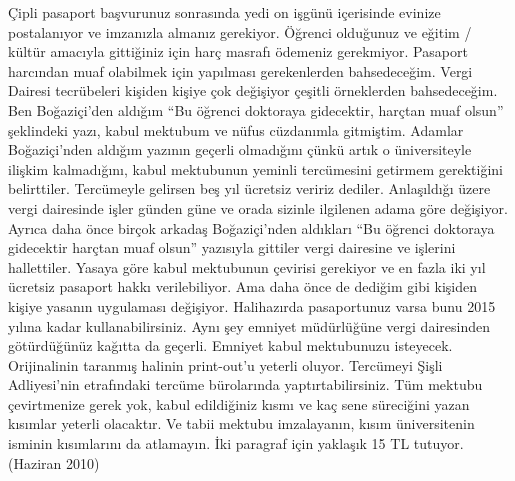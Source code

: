 \documentclass[12pt]{article}
\begin{document}
Çipli pasaport başvurunuz sonrasında yedi on işgünü içerisinde evinize postalanıyor ve imzanızla almanız gerekiyor. Öğrenci olduğunuz ve eğitim / kültür amacıyla gittiğiniz için harç masrafı ödemeniz gerekmiyor. Pasaport harcından muaf olabilmek için yapılması gerekenlerden bahsedeceğim. Vergi Dairesi tecrübeleri kişiden kişiye çok değişiyor çeşitli örneklerden bahsedeceğim. Ben Boğaziçi’den aldığım “Bu öğrenci doktoraya gidecektir, harçtan muaf olsun” şeklindeki yazı, kabul mektubum ve nüfus cüzdanımla gitmiştim. Adamlar Boğaziçi’nden aldığım yazının geçerli olmadığını çünkü artık o üniversiteyle ilişkim kalmadığını, kabul mektubunun yeminli tercümesini getirmem gerektiğini belirttiler. Tercümeyle gelirsen beş yıl ücretsiz veririz dediler. Anlaşıldığı üzere vergi dairesinde işler günden güne ve orada sizinle ilgilenen adama göre değişiyor. Ayrıca daha önce birçok arkadaş Boğaziçi’nden aldıkları “Bu öğrenci doktoraya gidecektir harçtan muaf olsun” yazısıyla gittiler vergi dairesine ve işlerini hallettiler. Yasaya göre kabul mektubunun çevirisi gerekiyor ve en fazla iki yıl ücretsiz pasaport hakkı verilebiliyor. Ama daha önce de dediğim gibi kişiden kişiye yasanın uygulaması değişiyor. Halihazırda pasaportunuz varsa bunu 2015 yılına kadar kullanabilirsiniz. Aynı şey emniyet müdürlüğüne vergi dairesinden götürdüğünüz kağıtta da geçerli. Emniyet kabul mektubunuzu isteyecek. Orijinalinin taranmış halinin print-out’u yeterli oluyor. Tercümeyi Şişli Adliyesi’nin etrafındaki tercüme bürolarında yaptırtabilirsiniz. Tüm mektubu çevirtmenize gerek yok, kabul edildiğiniz kısmı ve kaç sene süreciğini yazan kısımlar yeterli olacaktır. Ve tabii mektubu imzalayanın, kısım üniversitenin isminin kısımlarını da atlamayın. İki paragraf için yaklaşık 15 TL tutuyor. (Haziran 2010)
\end{document}

